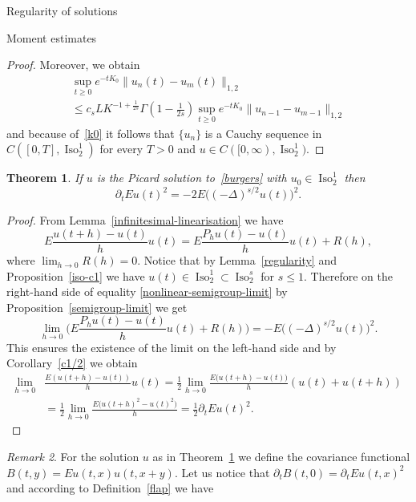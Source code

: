 \documentclass[a4paper,10pt,fleqn]{amsart}
\newtheorem{theorem}{Theorem}[section]
\theoremstyle{remark}
\newtheorem{remark}[theorem]{Remark}
\theoremstyle{definition}
\DeclareMathOperator{\Iso}{Iso}
\newcommand{\dt} {\partial_t}
\renewcommand{\=} {\overset{d}{=}}
\begin{document}
\begin{section}{Regularity of solutions}
\begin{subsection}{Moment estimates}
\begin{proof}
     Moreover, we obtain
     \begin{multline*}
      \sup_{t\geq0}e^{-tK_0}\|u_{n}(t)-u_m(t)\|_{1,2} \\\leq {c}_sLK^{-1+\frac{1}{2s}}\Gamma(1-\tfrac{1}{2s})\sup_{t\geq0}e^{-tK_0}\|u_{n-1}-u_{m-1}\|_{1,2}
     \end{multline*}
     and because of~\eqref{k0} it follows that $\{u_n\}$ is a Cauchy sequence in $C([0,T],\Iso^1_2)$ for every $T>0$ and $u\in C([0,\infty),\Iso^1_2)$.
    \end{proof}
    \begin{theorem}\label{rosenblatt}
        If $u$ is the Picard solution to~\eqref{burgers} with $u_0\in\Iso^1_2$ then
        \begin{equation*}
        \dt Eu(t)^2 = -2E\big((-\Delta)^{s/2}u(t)\big)^2.
    \end{equation*}
    \end{theorem}
    \begin{proof}
     From Lemma~\ref{infinitesimal-linearisation} we have
     \begin{equation}\label{nonlinear-semigroup-limit}
      E\frac{u(t+h)-u(t)}{h}u(t) = E\frac{P_hu(t)-u(t)}{h}u(t) + R(h),
     \end{equation}
     where $\lim_{h\to0}R(h)=0$.
     Notice that by Lemma~\ref{regularity} and Proposition~\ref{iso-c1} we have $u(t)\in\Iso^1_2\subset\Iso^s_2$ for $s\leq1$.
     Therefore on the right-hand side of equality \eqref{nonlinear-semigroup-limit} by Proposition~\ref{semigroup-limit} we get
     \begin{equation*}
      \lim_{h\to0}\Big(E\frac{P_hu(t)-u(t)}{h}u(t) + R(h)\Big) = -E\big((-\Delta)^{s/2}u(t)\big)^2.
     \end{equation*}
     This ensures the existence of the limit on the left-hand side
     and by Corollary~\ref{c1/2} we obtain
     \begin{align*}
      \lim_{h\to 0} &\frac{E(u(t+h)-u(t))}{h}u(t)
      = \frac{1}{2} \lim_{h\to 0} \frac{E\big(u(t+h)-u(t)\big)}{h}(u(t)+u(t+h))\\
      &= \frac{1}{2} \lim_{h\to 0} \frac{E\big(u(t+h)^2-u(t)^2\big)}{h}
      = \frac{1}{2}\dt Eu(t)^2.
     \end{align*}
    \end{proof}
    \begin{remark}\label{covariance}
    For the solution $u$ as in Theorem~\ref{rosenblatt} we define the covariance functional $B(t,y) = Eu(t,x)u(t,x+y)$. Let us notice that
     $\dt B(t,0) = \dt Eu(t,x)^2$ and according to Definition~\ref{flap} we have

\end{remark}
\end{subsection}
\end{section}
\end{document}
